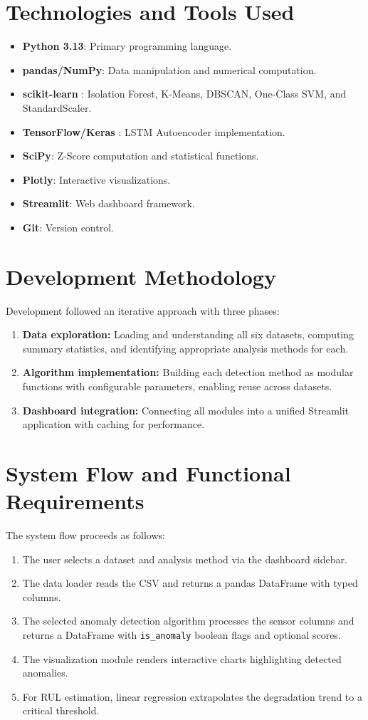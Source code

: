 \documentclass{CLS_zhou430}
\begin{document}
\section{Technologies and Tools Used}
\begin{itemize}
    \item \textbf{Python 3.13}: Primary programming language.
    \item \textbf{pandas/NumPy}: Data manipulation and numerical computation.
    \item \textbf{scikit-learn} \cite{pedregosa2011scikit}: Isolation Forest, K-Means, DBSCAN, One-Class SVM, and StandardScaler.
    \item \textbf{TensorFlow/Keras} \cite{tensorflow2015}: LSTM Autoencoder implementation.
    \item \textbf{SciPy}: Z-Score computation and statistical functions.
    \item \textbf{Plotly}: Interactive visualizations.
    \item \textbf{Streamlit}: Web dashboard framework.
    \item \textbf{Git}: Version control.
\end{itemize}

\section{Development Methodology}
Development followed an iterative approach with three phases:
\begin{enumerate}
    \item \textbf{Data exploration:} Loading and understanding all six datasets, computing summary statistics, and identifying appropriate analysis methods for each.
    \item \textbf{Algorithm implementation:} Building each detection method as modular functions with configurable parameters, enabling reuse across datasets.
    \item \textbf{Dashboard integration:} Connecting all modules into a unified Streamlit application with caching for performance.
\end{enumerate}

\section{System Flow and Functional Requirements}
The system flow proceeds as follows:
\begin{enumerate}
    \item The user selects a dataset and analysis method via the dashboard sidebar.
    \item The data loader reads the CSV and returns a pandas DataFrame with typed columns.
    \item The selected anomaly detection algorithm processes the sensor columns and returns a DataFrame with \texttt{is\_anomaly} boolean flags and optional scores.
    \item The visualization module renders interactive charts highlighting detected anomalies.
    \item For RUL estimation, linear regression extrapolates the degradation trend to a critical threshold.
\end{enumerate}
\end{document}
